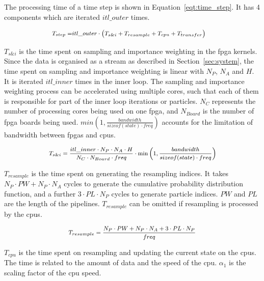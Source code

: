 The processing time of a time step is shown in Equation~\ref{eqt:time_step}.
It has 4 components which are iterated $itl\_outer$ times.

\begin{equation}
\footnotesize
\begin{aligned}
T_{step} = & itl\_outer \cdot \left (T_{s\&i} + T_{resample} + T_{cpu} + T_{transfer} \right)
\end{aligned}
\label{eqt:time_step}
\end{equation}
 
$T_{s\&i}$ is the time spent on sampling and importance weighting in the \gls{fpga} kernels.
Since the data is organised as a stream as described in Section~\ref{sec:system}, the time spent on sampling and importance weighting is linear with $N_P$, $N_A$ and $H$.
It is iterated $itl\_inner$ times in the inner loop.
The sampling and importance weighting process can be accelerated using multiple cores, such that each of them is responsible for part of the inner loop iterations or particles.
$N_C$ represents the number of processing cores being used on one \gls{fpga}, and $N_{Board}$ is the number of \gls{fpga} boards being used.
$min(1,\frac{bandwidth}{sizeof(state) \cdot freq})$ accounts for the limitation of bandwidth between \gls{fpga}s and \gls{cpu}s.

\begin{equation}
\footnotesize
\begin{aligned}
T_{s\&i} = \frac{itl\_inner \cdot N_P \cdot N_A \cdot H}{N_C \cdot N_{Board} \cdot freq} \cdot \min\left(1,\frac{bandwidth}{sizeof(state) \cdot freq}\right)
\end{aligned}
\end{equation}

$T_{resample}$ is the time spent on generating the resampling indices.
It takes $N_P \cdot PW + N_P \cdot N_A$ cycles to generate the cumulative probability distribution function, and a further $3 \cdot PL \cdot N_P$ cycles to generate particle indices.
$PW$ and $PL$ are the length of the pipelines.
$T_{resample}$ can be omitted if resampling is processed by the \gls{cpu}s.

\begin{equation}
\footnotesize
\begin{aligned}
T_{resample} = \frac{N_P \cdot PW + N_P \cdot N_A + 3 \cdot PL \cdot N_P}{freq}
\end{aligned}
\end{equation}

$T_{cpu}$ is the time spent on resampling and updating the current state on the \gls{cpu}s.
The time is related to the amount of data and the speed of the \gls{cpu}.
$\alpha_1$ is the scaling factor of the \gls{cpu} speed.

